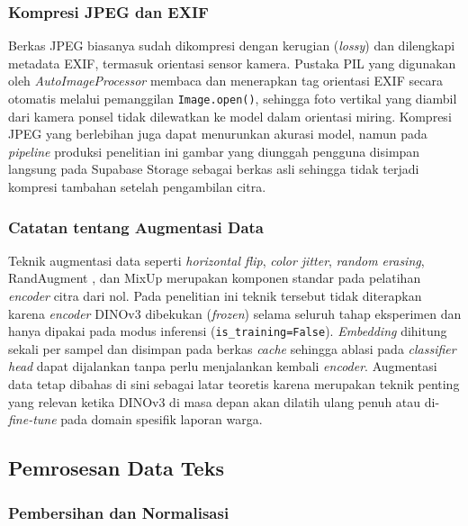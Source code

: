 \subsubsection{Kompresi JPEG dan EXIF}

Berkas JPEG biasanya sudah dikompresi dengan kerugian (\textit{lossy}) dan dilengkapi metadata EXIF, termasuk orientasi sensor kamera. Pustaka PIL yang digunakan oleh \textit{AutoImageProcessor} membaca dan menerapkan tag orientasi EXIF secara otomatis melalui pemanggilan \texttt{Image.open()}, sehingga foto vertikal yang diambil dari kamera ponsel tidak dilewatkan ke model dalam orientasi miring. Kompresi JPEG yang berlebihan juga dapat menurunkan akurasi model, namun pada \textit{pipeline} produksi penelitian ini gambar yang diunggah pengguna disimpan langsung pada Supabase Storage sebagai berkas asli sehingga tidak terjadi kompresi tambahan setelah pengambilan citra.

\subsubsection{Catatan tentang Augmentasi Data}

Teknik augmentasi data seperti \textit{horizontal flip}, \textit{color jitter}, \textit{random erasing}, RandAugment \citep{cubukRandAugment2020}, dan MixUp \citep{zhangMixup2018} merupakan komponen standar pada pelatihan \textit{encoder} citra dari nol. Pada penelitian ini teknik tersebut tidak diterapkan karena \textit{encoder} DINOv3 dibekukan (\textit{frozen}) selama seluruh tahap eksperimen dan hanya dipakai pada modus inferensi (\texttt{is\_training=False}). \textit{Embedding} dihitung sekali per sampel dan disimpan pada berkas \textit{cache} sehingga ablasi pada \textit{classifier head} dapat dijalankan tanpa perlu menjalankan kembali \textit{encoder}. Augmentasi data tetap dibahas di sini sebagai latar teoretis karena merupakan teknik penting yang relevan ketika DINOv3 di masa depan akan dilatih ulang penuh atau di-\textit{fine-tune} pada domain spesifik laporan warga.

\subsection{Pemrosesan Data Teks}
\label{sec:textproc-detail}

\subsubsection{Pembersihan dan Normalisasi}

